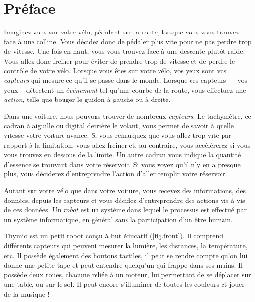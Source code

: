 \chapter*{Préface}


Imaginez-vous sur votre vélo, pédalant sur la route, lorsque vous vous trouvez face à une colline.
Vous décidez donc de pédaler plus vite pour ne pas perdre trop de vitesse.
Une fois en haut, vous vous trouvez face à une descente plutôt raide.
Vous allez donc freiner pour éviter de prendre trop de vitesse et de perdre le contrôle de votre vélo.
Lorsque vous êtes sur votre vélo, vos yeux sont vos \textit{capteurs} qui mesure ce qu'il se passe dans le monde.
Lorsque ces capteurs --- vos yeux -- détectent un \textit{événement} tel qu'une courbe de la route, vous effectuez une \textit{action}, telle que bouger le guidon à gauche ou à droite.

Dans une voiture, nous pouvons trouver de nombreux \textit{capteurs}.
Le tachymètre, ce cadran à aiguille ou digital derrière le volant, vous permet de savoir à quelle vitesse votre voiture avance.
Si vous remarquez que vous allez trop vite par rapport à la limitation, vous allez freiner et, au contraire, vous accélérerez si vous vous trouvez en dessous de la limite.
Un autre cadran vous indique la quantité d'essence se trouvant dans votre réservoir.
Si vous voyez qu'il n'y en a presque plus, vous déciderez d'entreprendre l'action d'aller remplir votre réservoir.
 
Autant sur votre vélo que dans votre voiture, vous recevez des informations, des données, depuis les capteurs et vous décidez d'entreprendre des actions vis-à-vis de ces données. Un \textit{robot} est un système dans lequel le processus est effectué par un système informatique, en général sans la participation d'un être humain.


Thymio est un petit robot conçu à but éducatif (\cref{fig.front}).
Il comprend différents capteurs qui peuvent mesurer la lumière, les distances, la température, etc.
Il possède également des boutons tactiles, il peut se rendre compte qu'on lui donne une petite tape et peut entendre quelqu'un qui frappe dans ses mains.
Il possède deux roues, chacune reliée à un moteur, lui permettant de se déplacer sur une table, ou sur le sol.
Il peut encore s'illuminer de toutes les couleurs et jouer de la musique !

